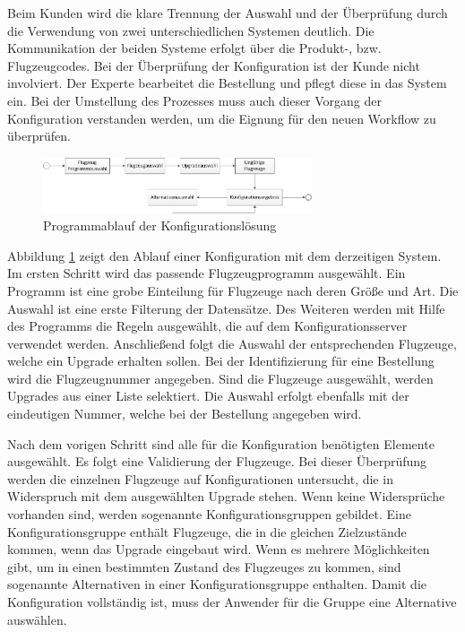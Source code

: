 Beim Kunden wird die klare Trennung der Auswahl und der Überprüfung durch die Verwendung von zwei unterschiedlichen Systemen deutlich. Die Kommunikation der beiden Systeme erfolgt über die Produkt-, bzw. Flugzeugcodes. Bei der Überprüfung der Konfiguration ist der Kunde  nicht involviert. Der Experte bearbeitet die Bestellung und pflegt diese in das System ein. Bei der Umstellung des Prozesses muss auch dieser Vorgang der Konfiguration verstanden werden, um die Eignung für den neuen Workflow zu überprüfen. \par 
\begin{figure}
\label{webguiAblauf}
\centering
\includegraphics[width=300px]{images/workflow_webgui}
\caption{Programmablauf der Konfigurationslösung}
\end{figure}

Abbildung \ref{webguiAblauf} zeigt den Ablauf einer Konfiguration mit dem derzeitigen System.
Im ersten Schritt wird das passende Flugzeugprogramm ausgewählt. Ein Programm ist eine grobe Einteilung für Flugzeuge nach deren Größe und Art. Die Auswahl ist eine erste Filterung der Datensätze. Des Weiteren werden mit Hilfe des Programms die Regeln ausgewählt, die auf dem Konfigurationsserver verwendet werden. Anschließend folgt die Auswahl der entsprechenden Flugzeuge, welche ein Upgrade erhalten sollen. Bei der Identifizierung für eine Bestellung wird die Flugzeugnummer angegeben. Sind die Flugzeuge ausgewählt, werden Upgrades aus einer Liste selektiert. Die Auswahl erfolgt ebenfalls mit der eindeutigen Nummer, welche bei der Bestellung angegeben wird. \par 

Nach dem vorigen Schritt sind alle für die Konfiguration benötigten Elemente ausgewählt. Es folgt eine Validierung der Flugzeuge. Bei dieser Überprüfung werden die einzelnen Flugzeuge auf Konfigurationen untersucht, die in Widerspruch mit dem ausgewählten Upgrade stehen. Wenn keine Widersprüche vorhanden sind, werden sogenannte Konfigurationsgruppen gebildet. Eine Konfigurationsgruppe enthält Flugzeuge, die in die gleichen Zielzustände kommen, wenn das Upgrade eingebaut wird. Wenn es mehrere Möglichkeiten gibt, um in einen bestimmten Zustand des Flugzeuges zu kommen, sind sogenannte Alternativen in einer Konfigurationsgruppe enthalten. Damit die Konfiguration vollständig ist, muss der Anwender für die Gruppe eine Alternative auswählen. \par

